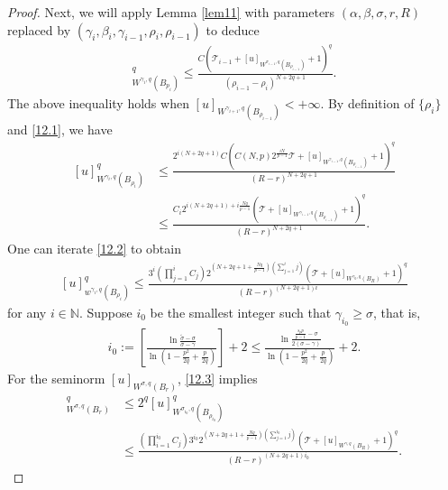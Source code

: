 \documentclass[reqno,10pt]{amsart}
\numberwithin{equation}{section}
\begin{document}
\begin{proof}
	Next, we will apply Lemma \ref{lem11} with parameters $(\alpha, \beta, \sigma, r, R)$ replaced by $\left(\gamma_i, \beta_i, \gamma_{i-1}, \rho_i, \rho_{i-1}\right)$ to deduce
	\begin{align*}
		[u]_{W^{\gamma_i ,q}\left(B_{p_i}\right)}^q \leq \frac{C\left(\mathcal{T}_{i-1}+[u]_{W^{\sigma_{i-1}, q}\left(B_{\rho_{i-1}}\right)}+1\right)^q}{\left(\rho_{i-1}-\rho_i\right)^{N+2 q+1}} .
	\end{align*}
	The above inequality holds when $[u]_{W^{\gamma_ {i+1}, q}{\left(B_{\rho_{i-1}}\right)}}<+\infty$.
	By definition of $\{\rho_i\}$ and \eqref{12.1}, we have 
	\begin{align}\label{12.2}
		[u]_{W^{\gamma_i,q }\left(B_{\rho_i}\right)} ^q &\leq \frac{2^{i(N+2q+1)}C\left(C(N, p) 2^{\frac{i N}{p-1}} \mathcal{T}+[u]_{W^{\gamma_{i-1}, q}\left(B_{\rho_{i-1}}\right)}+1\right)^q}{(R-r)^{N+2q+1}} \nonumber\\
		&\leq \frac{C_i 2^{i(N+2q+1)+i\frac{Nq}{p-1}}\left(\mathcal{T}+[u] _{W^{\gamma_{i-1},q}\left(B_{\rho_{i-1}}\right)}+1\right)^q}{(R-r)^{N+2q+1}} .
	\end{align}
	One can iterate \eqref{12.2} to obtain 
	\begin{align}\label{12.3}
		[u]^q_{w^{\gamma_i, q}\left(B_{\rho_i}\right)} \leq \frac{3^{i}\left(\prod\limits_{j=1}^i C_j\right)  2^{\left(N+2q+1+\frac{Nq}{p-1}\right)\left(\sum\limits_{j=1}^i j\right)}\left(\mathcal{T}+[u]_{W^{\gamma_0, q}\left(B_R\right)}+1\right)^q}{(R-r)^{(N+2q+1)i}}
	\end{align}
	for any $i\in \mathbb{N}$. Suppose $i_0$ be the smallest integer such that $\gamma_{i_0} \geq \sigma$, that is,
	\begin{align*}
		i_0:=\left[\frac{\ln \frac{\tilde{\sigma}-\sigma}{\sigma-\gamma}}{\ln \left(1-\frac{p^2}{2 q}+\frac{p}{2 q}\right)}\right]+2 \leq \frac{\ln \frac{\frac{s_p p}{p-1}-\sigma}{2(\sigma-\gamma)}}{\ln \left(1-\frac{p^2}{2 q}+\frac{p}{2 q}\right)}+2 .
	\end{align*}
	For the seminorm $[u]_{W^{\sigma, q}\left(B_r\right)}$, \eqref{12.3} implies 
	\begin{align*}
		[u]_{W^{\sigma, q}\left(B_r\right)}^q &\leq 2^q[u]_{W^{\sigma_{i_0}, q}\left(B_{\rho_{i_0}}\right)}^q \\
		& \leq \frac{\left(\prod\limits_{i=1}^{i_0} C_j\right) 3^{i_0} 2^{\left(N+2q+1+\frac{Nq}{p-1}\right)\left(\sum\limits_{j=1}^{i_0} j\right)}\left(\mathcal{T}+[u]_{W^{\gamma, q}\left(B_R\right)}+1\right)^q}{(R-r)^{(N+2q+1) i_0}} .
	\end{align*}

\end{proof}
\end{document}
